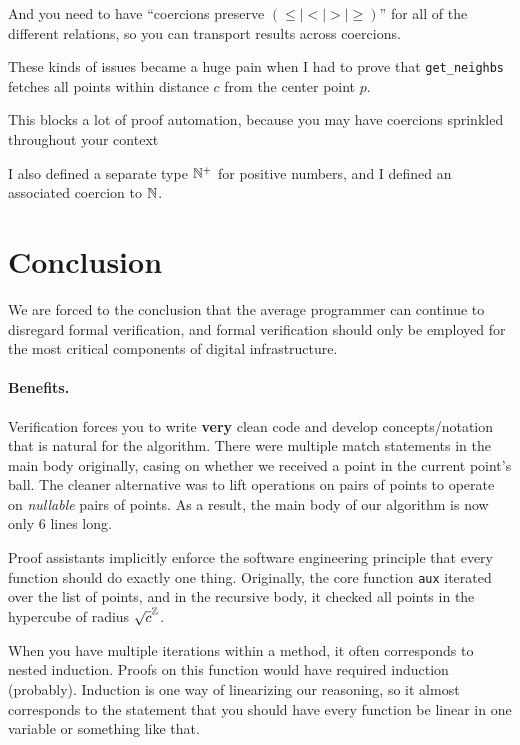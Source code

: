 \documentclass{article}
\begin{document}
And you need to have ``coercions preserve $(\leq \mid < \mid > \mid \geq)$'' for all of the different relations, so you can transport results across coercions.

These kinds of issues became a huge pain when I had to prove that \texttt{get\_neighbs} fetches all points within distance $c$ from the center point $p$.

This blocks a lot of proof automation, because you may have coercions sprinkled throughout your context

I also defined a separate type $\mathbb{N}^+$ for positive numbers, and I defined an associated coercion to $\mathbb{N}$.

\section{Conclusion}
We are forced to the conclusion that the average programmer can continue to disregard formal verification, and formal verification should only be employed for the most critical components of digital infrastructure.

\paragraph{Benefits.}
Verification forces you to write \textbf{very} clean code and develop concepts/notation that is natural for the algorithm.
There were multiple match statements in the main body originally, casing on whether we received a point in the current point's ball.
The cleaner alternative was to lift operations on pairs of points to operate on \textit{nullable} pairs of points.
As a result, the main body of our algorithm is now only 6 lines long.

Proof assistants implicitly enforce the software engineering principle that every function should do exactly one thing.
Originally, the core function \texttt{aux} iterated over the list of points, and in the recursive body, it checked all points in the hypercube of radius $\sqrt{c}^{\mathbb{Z}}$.

When you have multiple iterations within a method, it often corresponds to nested induction.
Proofs on this function would have required induction (probably).
Induction is one way of linearizing our reasoning, so it almost corresponds to the statement that you should have every function be linear in one variable or something like that.
\end{document}
